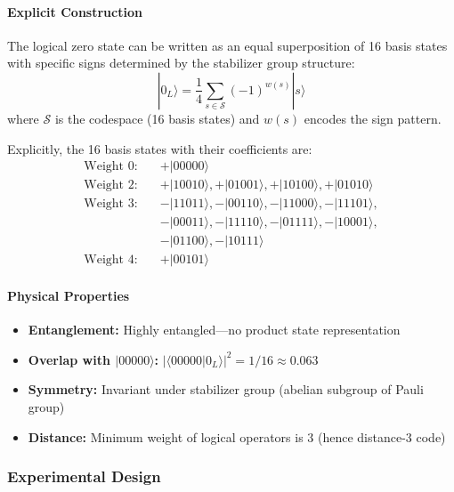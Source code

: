 \paragraph{Explicit Construction}

The logical zero state can be written as an equal superposition of 16 basis states with specific signs determined by the stabilizer group structure:
\begin{equation}
|0_L\rangle = \frac{1}{4} \sum_{s \in \mathcal{S}} (-1)^{w(s)} |s\rangle
\end{equation}
where $\mathcal{S}$ is the codespace (16 basis states) and $w(s)$ encodes the sign pattern.

Explicitly, the 16 basis states with their coefficients are:
\begin{align*}
\text{Weight 0:} \quad &+|00000\rangle \\
\text{Weight 2:} \quad &+|10010\rangle, +|01001\rangle, +|10100\rangle, +|01010\rangle \\
\text{Weight 3:} \quad &-|11011\rangle, -|00110\rangle, -|11000\rangle, -|11101\rangle, \\
&-|00011\rangle, -|11110\rangle, -|01111\rangle, -|10001\rangle, \\
&-|01100\rangle, -|10111\rangle \\
\text{Weight 4:} \quad &+|00101\rangle
\end{align*}

\paragraph{Physical Properties}

\begin{itemize}
\item \textbf{Entanglement:} Highly entangled—no product state representation
\item \textbf{Overlap with $|00000\rangle$:} $|\langle 00000 | 0_L \rangle|^2 = 1/16 \approx 0.063$
\item \textbf{Symmetry:} Invariant under stabilizer group (abelian subgroup of Pauli group)
\item \textbf{Distance:} Minimum weight of logical operators is 3 (hence distance-3 code)
\end{itemize}

\subsubsection{Experimental Design}

